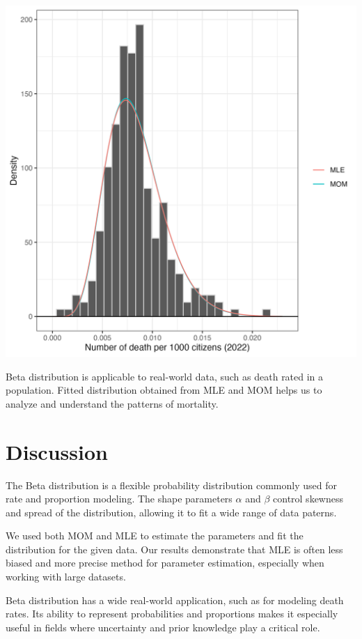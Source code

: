 \documentclass{article}\usepackage[]{graphicx}\usepackage[]{xcolor}
\newenvironment{Figure}
  {\par\medskip\noindent\minipage{\linewidth}}
  {\endminipage\par\medskip}
\begin{document}
\begin{multicols}{2}
\begin{Figure}
 \centering
 \includegraphics[width=\linewidth]{deathdata.png}
 \label{fig:deathdata}
\end{Figure}

Beta distribution is applicable to real-world data, such as death rated in a population. Fitted distribution obtained from MLE and MOM helps us to analyze and understand the patterns of mortality.


\section{Discussion}
The Beta distribution is a flexible probability distribution commonly used for rate and proportion modeling. The shape parameters $\alpha$ and $\beta$ control skewness and spread of the distribution, allowing it to fit a wide range of data paterns.

We used both MOM and MLE to estimate the parameters and fit the distribution for the given data. Our results demonstrate that MLE is often less biased and more precise method for parameter estimation, especially when working with large datasets. 

Beta distribution has a wide real-world application, such as for modeling death rates. Its ability to represent probabilities and proportions makes it especially useful in fields where uncertainty and prior knowledge play a critical role.

\vspace{2em}

\begin{tiny}

\end{tiny}
\end{multicols}
\end{document}

